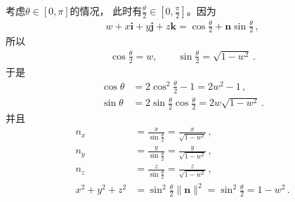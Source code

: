 \begin{prove}
    考虑$\theta\in[0,\pi]$的情况，
    此时有$\displaystyle\frac{\theta}{2}\in[0,\frac{\pi}{2}]$。因为
    \begin{align}
        w+x\mathbf{i}+y\mathbf{j}+z\mathbf{k}=\cos\frac{\theta}{2}+\bm n\sin\frac{\theta}{2}\, ,
    \end{align}
    所以
    \begin{align}
        \cos\frac{\theta}{2}=w,\qquad\sin\frac{\theta}{2}=\sqrt{1-w^2}\, .
    \end{align}
    于是
    \begin{align}
        \cos\theta & =2\cos^2\frac{\theta}{2}-1=2w^2-1\, ,                         \\
        \sin\theta & =2\sin\frac{\theta}{2}\cos\frac{\theta}{2}=2w\sqrt{1-w^2}\, .
    \end{align}
    并且
    \begin{align}
        n_x         & =\frac{x}{\sin\frac{\theta}{2}}=\frac{x}{\sqrt{1-w^2}}\, ,          \\
        n_y         & =\frac{y}{\sin\frac{\theta}{2}}=\frac{y}{\sqrt{1-w^2}}\, ,          \\
        n_z         & =\frac{z}{\sin\frac{\theta}{2}}=\frac{z}{\sqrt{1-w^2}}\, ,          \\
        x^2+y^2+z^2 & =\sin^2\frac{\theta}{2}\|\bm n\|^2=\sin^2\frac{\theta}{2}=1-w^2\, .
    \end{align}


\end{prove}
